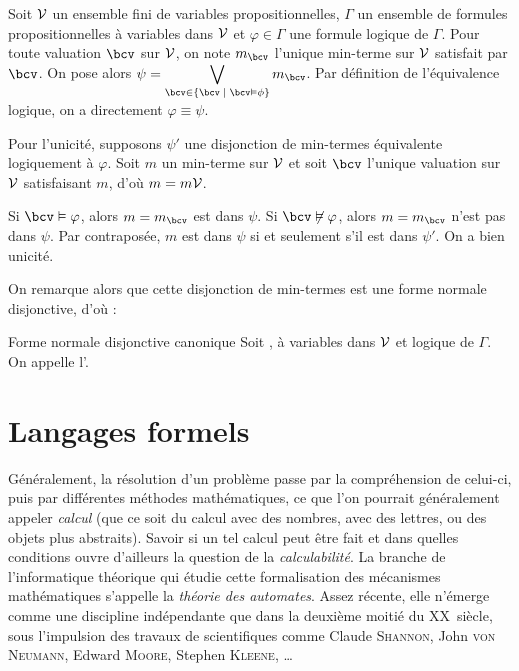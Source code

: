 \documentclass[a4paper,french,bookmarks]{book}
\begin{document}
    \begin{nproof}
        Soit $\mathcal{V}$ un ensemble fini de variables propositionnelles, $\Gamma$ un ensemble de formules propositionnelles à variables dans $\mathcal{V}$ et $\varphi \in \Gamma$ une formule logique de $\Gamma$. Pour toute valuation $\bcv$ sur $\mathcal{V}$, on note $m_\bcv$ l'unique min-terme sur $\mathcal{V}$ satisfait par $\bcv$. On pose alors $\psi = \displaystyle\bigvee_{\bcv \in \ens{\bcv \enstq \bcv \vDash \phi}} m_\bcv$. Par définition de l'équivalence logique, on a directement $\varphi \equiv \psi$.\medskip
        
        Pour l'unicité, supposons $\psi'$ une disjonction de min-termes équivalente logiquement à $\varphi$. Soit $m$ un min-terme sur $\mathcal{V}$ et soit $\bcv$ l'unique valuation sur $\mathcal{V}$ satisfaisant $m$, d'où $m = m\mathcal{V}$. 
        
        Si $\bcv \vDash \varphi$, alors $m = m_\bcv$ est dans $\psi$. Si $\bcv \not\vDash \varphi$, alors $m = m_\bcv$ n'est pas dans $\psi$. Par contraposée, $m$ est dans $\psi$ si et seulement s'il est dans $\psi'$. On a bien unicité.
    \end{nproof}
    
    On remarque alors que cette disjonction de min-termes est une forme normale disjonctive, d'où :
    \begin{definition}{Forme normale disjonctive canonique}{}
        Soit ,  à variables dans $\mathcal{V}$ et  logique de $\Gamma$. On appelle  l'.
    \end{definition}
    
    \chapter{Langages formels}
    
    Généralement, la résolution d'un problème passe par la compréhension de celui-ci, puis par différentes méthodes mathématiques, ce que l'on pourrait généralement appeler \textit{calcul} (que ce soit du calcul avec des nombres, avec des lettres, ou des objets plus abstraits). Savoir si un tel calcul peut être fait et dans quelles conditions ouvre d'ailleurs la question de la \textit{calculabilité}. La branche de l'informatique théorique qui étudie cette formalisation des mécanismes mathématiques s'appelle la \textit{théorie des automates}. Assez récente, elle n'émerge comme une discipline indépendante que dans la deuxième moitié du \textsc{XX}\ieme~siècle, sous l'impulsion des travaux de scientifiques comme Claude \textsc{Shannon}, John \textsc{von Neumann}, Edward \textsc{Moore}, Stephen \textsc{Kleene}, \dots 
    
\end{document}
